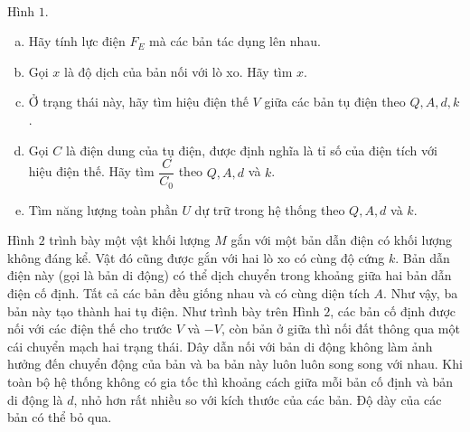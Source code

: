 \begin{vd}
\begin{enumerate}[1)]
\begin{center}
\\ Hình $1$.
    \end{center}
    \begin{enumerate}[a)]
        \item Hãy tính lực điện $F_{E}$ mà các bản tác dụng lên nhau.
        \item Gọi $x$ là độ dịch của bản nối với lò xo. Hãy tìm $x$.
        \item Ở trạng thái này, hãy tìm hiệu điện thế $V$ giữa các bản tụ điện theo $Q, A, d, k$.
        \item Gọi $C$ là điện dung của tụ điện, được định nghĩa là tỉ số của điện tích với hiệu điện thế. Hãy tìm $ \dfrac{C}{C_0}$ theo $Q, A, d$ và $k$.
        \item Tìm năng lượng toàn phần $U$ dự trữ trong hệ thống theo $Q, A, d$ và $k$.
    \end{enumerate}
    \end{enumerate}
    Hình $2$ trình bày một vật khối lượng $M$ gắn với một bản dẫn điện có khối lượng không đáng kể. Vật đó cũng được gắn với hai lò xo có cùng độ cứng $k$. Bản dẫn điện này (gọi là bản di động) có thể dịch chuyển trong khoảng giữa hai bản dẫn điện cố định. Tất cả các bản đều giống nhau và có cùng diện tích $A$. Như vậy, ba bản này tạo thành hai tụ điện. Như trình bày trên Hình $2$, các bản cố định được nối với các điện thế cho trước $V$ và $-V$, còn bản ở giữa thì nối đất thông qua một cái chuyển mạch hai trạng thái. Dây dẫn nối với bản di động không làm ảnh hưởng đến chuyển động của bản và ba bản này luôn luôn song song với nhau. Khi toàn bộ hệ thống không có gia tốc thì khoảng cách giữa mỗi bản cố định và bản di động là $d$, nhỏ hơn rất nhiều so với kích thước của các bản. Độ dày của các bản có thể bỏ qua.
    \begin{center}
        

 
\tikzset{
pattern size/.store in=\mcSize, 
pattern size = 5pt,
pattern thickness/.store in=\mcThickness, 
pattern thickness = 0.3pt,
pattern radius/.store in=\mcRadius, 
pattern radius = 1pt}
\makeatletter
{}
\makeatother
{} %


\end{center}
\end{vd}

